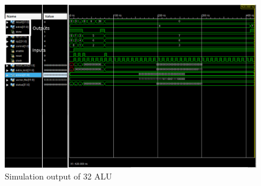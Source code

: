 \documentclass{article}
\begin{document}
    \begin{figure}[H]
        \centering
        \includegraphics[width=0.9\paperwidth,center]{Screenshots/alu_32.png}
        \caption{Simulation output of 32 ALU}
    \end{figure}
\end{document}
